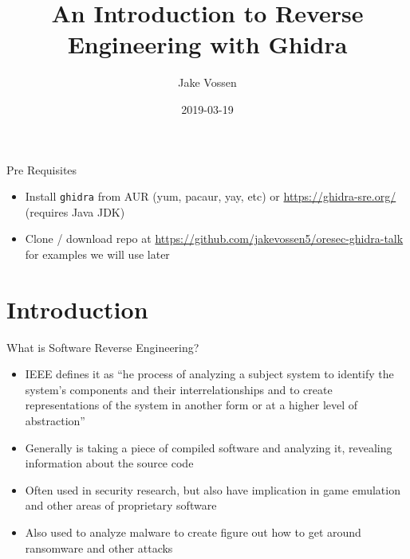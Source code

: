 \documentclass{beamer}
\title[Ghidra]{An Introduction to Reverse Engineering with Ghidra}
\author{Jake Vossen}
\institute{Colorado School of Mines - oresec}
\date{2019-03-19}
\begin{document}
\begin{frame}{Pre Requisites}
  \begin{itemize}
    \item Install \texttt{ghidra} from AUR (yum, pacaur, yay, etc) or
      \url{https://ghidra-sre.org/} (requires Java JDK)
    \item Clone / download repo at
\url{https://github.com/jakevossen5/oresec-ghidra-talk} for examples we will use later
    \end{itemize}
\end{frame}
\begin{frame}
  \titlepage
\end{frame}


\section{Introduction}

\begin{frame}{What is Software Reverse Engineering?}

\begin{itemize}
  \item IEEE defines it as ``he process of analyzing a subject system to identify the system's components and their interrelationships and to create representations of the system in another form or at a higher level of abstraction''
  \item Generally is taking a piece of compiled software and analyzing
    it, revealing information about the source code
  \item Often used in security research, but also have implication in
    game emulation and other areas of proprietary software
  \item Also used to analyze malware to create figure out how to get
    around ransomware and other attacks
\end{itemize}

\vskip 1cm

\end{frame}
\end{document}
